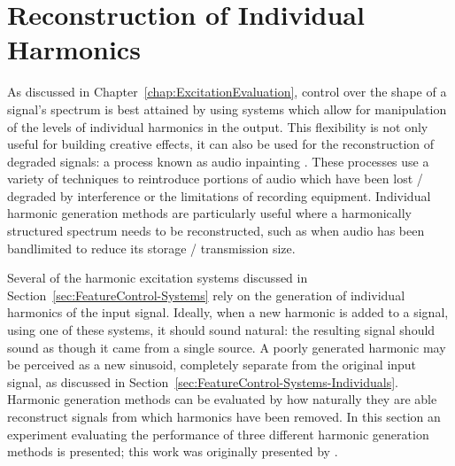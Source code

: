 \section{Reconstruction of Individual Harmonics}
\label{sec:PerceptualExperiments-Reconstruction}
	As discussed in Chapter~\ref{chap:ExcitationEvaluation}, control over the shape of a signal's spectrum is best
	attained by using systems which allow for manipulation of the levels of individual harmonics in the output. This
	flexibility is not only useful for building creative effects, it can also be used for the reconstruction of
	degraded signals: a process known as audio inpainting \citep{adler2012audio}. These processes use a variety of
	techniques to reintroduce portions of audio which have been lost / degraded by interference or the limitations of
	recording equipment. Individual harmonic generation methods are particularly useful where a harmonically structured
	spectrum needs to be reconstructed, such as when audio has been bandlimited to reduce its storage / transmission
	size.

	Several of the harmonic excitation systems discussed in Section~\ref{sec:FeatureControl-Systems} rely on the
	generation of individual harmonics of the input signal.  Ideally, when a new harmonic is added to a signal, using
	one of these systems, it should sound natural: the resulting signal should sound as though it came from a single
	source. A poorly generated harmonic may be perceived as a new sinusoid, completely separate from the original input
	signal, as discussed in Section~\ref{sec:FeatureControl-Systems-Individuals}.  Harmonic generation methods can be
	evaluated by how naturally they are able reconstruct signals from which harmonics have been removed. In this
	section an experiment evaluating the performance of three different harmonic generation methods is presented; this
	work was originally presented by \citet{enderby2013methods}.

